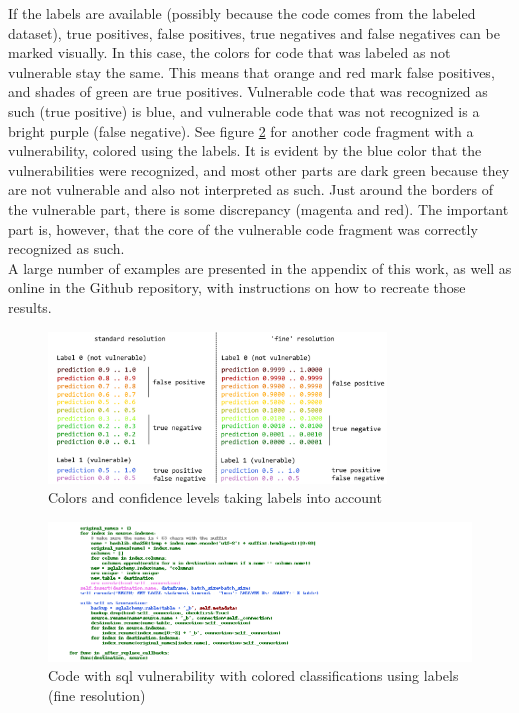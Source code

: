 \documentclass[
a4paper,
pagesize,
pdftex,
12pt,
twoside, %
BCOR=5mm, %
ngerman,
fleqn,
final,
]{scrartcl}
\begin{document}
	If the labels are available (possibly because the code comes from the labeled dataset), true positives, false positives, true negatives and false negatives can be marked visually. In this case, the colors for code that was labeled as not vulnerable stay the same. This means that orange and red mark false positives, and shades of green are true positives. Vulnerable code that was recognized as such (true positive) is blue, and vulnerable code that was not recognized is a bright purple (false negative). See figure \ref{fig:example2} for another code fragment with a vulnerability, colored using the labels. It is evident by the blue color that the vulnerabilities were recognized, and most other parts are dark green because they are not vulnerable and also not interpreted as such. Just around the borders of the vulnerable part, there is some discrepancy (magenta and red). The important part is, however, that the core of the vulnerable code fragment was correctly recognized as such.\\
	A large number of examples are presented in the appendix of this work, as well as online in the Github repository, with instructions on how to recreate those results.
	
	\begin{figure}[h]
		\centering
		\includegraphics[width=0.8\textwidth]{img/colorkeylabeled}
		\caption{Colors and confidence levels taking labels into account}
		\label{fig:examplecolored}
	\end{figure}


	\begin{figure}[h]
	\centering
	\includegraphics[width=1\textwidth]{img/exampleSQL.png}
	\caption{Code with sql vulnerability with colored classifications using labels (fine resolution)}
	\label{fig:example2}
	\end{figure}
	
\end{document}
